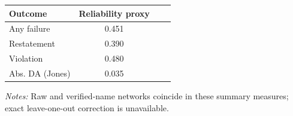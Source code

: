 \documentclass[10pt]{article}
\begin{document}
\begin{minipage}{19cm}\fontsize{10}{12}\selectfont\setlength{\tabcolsep}{4pt}\renewcommand{\arraystretch}{1.12}


\centering
{}
\begin{threeparttable}
\begin{tabular}{p{}ccc}
\toprule
Outcome & Reliability proxy &  &  \\
\midrule
Any failure & 0.451 &  &  \\
Restatement & 0.390 &  &  \\
Violation & 0.480 &  &  \\
Abs. DA (Jones) & 0.035 &  &  \\
\bottomrule
\end{tabular}
\begin{tablenotes}\fontsize{9}{11}\selectfont
\item \raggedright \fontsize{9}{11}\selectfont \textit{Notes:} Raw and verified-name networks coincide in these summary measures; exact leave-one-out correction is unavailable.
\end{tablenotes}
\end{threeparttable}

\end{minipage}
\end{document}
